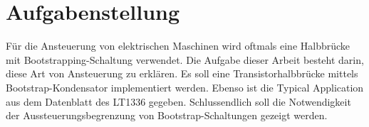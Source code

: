 \section*{Aufgabenstellung}
\thispagestyle{prolog}
\bigskip

Für die Ansteuerung von elektrischen Maschinen wird oftmals eine Halbbrücke mit Bootstrapping-Schaltung verwendet. Die Aufgabe dieser Arbeit besteht darin, diese Art von Ansteuerung zu erklären. Es soll eine Transistorhalbbrücke mittels Bootstrap-Kondensator implementiert werden. Ebenso ist die \glqq Typical Application\grqq{} aus dem Datenblatt des LT1336 gegeben. Schlussendlich soll die Notwendigkeit der Aussteuerungsbegrenzung von Bootstrap-Schaltungen gezeigt werden. 
\hbox{ }
